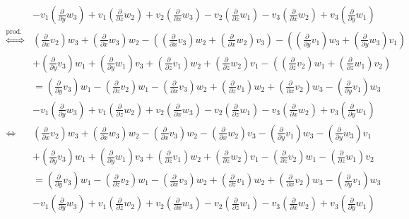 \documentclass[10pt,a4paper,parskip=half]{scrartcl}
\begin{document}
\begin{align*}
 &- v_1\left(\frac{\partial }{\partial y}w_3\right) + v_1\left(\frac{\partial }{\partial z}w_2\right) + v_2\left(\frac{\partial }{\partial x}w_3\right ) - v_2\left(\frac{\partial }{\partial z}w_1\right) - v_3\left(\frac{\partial }{\partial x}w_2\right) + v_3\left(\frac{\partial }{\partial y}w_1\right) \\
\stackrel{\text{prod. R.}}{\Leftrightarrow}\; &\left(\frac{\partial }{\partial x}v_2\right)w_3 +  \left(\frac{\partial }{\partial x}w_3\right)w_2 - \left(\left(\frac{\partial }{\partial x}v_3\right)w_2 + \left(\frac{\partial }{\partial x}w_2\right)v_3\right)  - \left(\left(\frac{\partial }{\partial y}v_1\right)w_3 + \left(\frac{\partial }{\partial y}w_3\right)v_1\right) \\
& + \left(\frac{\partial }{\partial y}v_3\right)w_1 + \left(\frac{\partial }{\partial y}w_1\right)v_3 + \left(\frac{\partial }{\partial z}v_1\right)w_2 + \left(\frac{\partial }{\partial z}w_2\right)v_1 - \left( \left(\frac{\partial }{\partial z}v_2\right)w_1 + \left(\frac{\partial }{\partial z}w_1\right)v_2 \right)\\
&= \left(\frac{\partial }{\partial y}v_3\right)w_1 - \left(\frac{\partial }{\partial z}v_2\right)w_1 - \left(\frac{\partial }{\partial x}v_3\right)w_2 + \left(\frac{\partial }{\partial z}v_1\right)w_2 + \left(\frac{\partial }{\partial x}v_2\right)w_3 - \left(\frac{\partial }{\partial y}v_1\right)w_3\\
 &- v_1\left(\frac{\partial }{\partial y}w_3\right) + v_1\left(\frac{\partial }{\partial z}w_2\right) + v_2\left(\frac{\partial }{\partial x}w_3\right ) - v_2\left(\frac{\partial }{\partial z}w_1\right) - v_3\left(\frac{\partial }{\partial x}w_2\right) + v_3\left(\frac{\partial }{\partial y}w_1\right) \\
\Leftrightarrow\; &\left(\frac{\partial }{\partial x}v_2\right)w_3 +  \left(\frac{\partial }{\partial x}w_3\right)w_2 - \left(\frac{\partial }{\partial x}v_3\right)w_2 - \left(\frac{\partial }{\partial x}w_2\right)v_3 - \left(\frac{\partial }{\partial y}v_1\right)w_3 - \left(\frac{\partial }{\partial y}w_3\right)v_1 \\
& + \left(\frac{\partial }{\partial y}v_3\right)w_1 + \left(\frac{\partial }{\partial y}w_1\right)v_3 + \left(\frac{\partial }{\partial z}v_1\right)w_2 + \left(\frac{\partial }{\partial z}w_2\right)v_1 - \left(\frac{\partial }{\partial z}v_2\right)w_1 - \left(\frac{\partial }{\partial z}w_1\right)v_2\\
&= \left(\frac{\partial }{\partial y}v_3\right)w_1 - \left(\frac{\partial }{\partial z}v_2\right)w_1 - \left(\frac{\partial }{\partial x}v_3\right)w_2 + \left(\frac{\partial }{\partial z}v_1\right)w_2 + \left(\frac{\partial }{\partial x}v_2\right)w_3 - \left(\frac{\partial }{\partial y}v_1\right)w_3\\
 &- v_1\left(\frac{\partial }{\partial y}w_3\right) + v_1\left(\frac{\partial }{\partial z}w_2\right) + v_2\left(\frac{\partial }{\partial x}w_3\right ) - v_2\left(\frac{\partial }{\partial z}w_1\right) - v_3\left(\frac{\partial }{\partial x}w_2\right) + v_3\left(\frac{\partial }{\partial y}w_1\right) \\
\end{align*}
\end{document}
